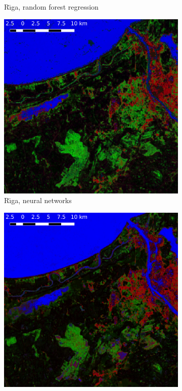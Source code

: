 \documentclass[a4paper,12pt]{scrbook}
\begin{document}
\begin{figure}
\begin{subfigure}[t]{.24\textwidth}
    \caption{R\={\i}ga, random forest regression}
    \label{subfig-riga-rf}
  \end{subfigure} \hfill
  \begin{subfigure}[t]{.24\textwidth}
    \includegraphics[width=\textwidth]{thesis-figures/figures-qgis/riga-nn}
    \caption{R\={\i}ga, neural networks}
    \label{subfig-riga-nn}
  \end{subfigure} \hfill
  \begin{subfigure}[t]{.24\textwidth}
    \includegraphics[width=\textwidth]{thesis-figures/figures-qgis/riga-cm}

\end{subfigure}
\end{figure}
\end{document}
